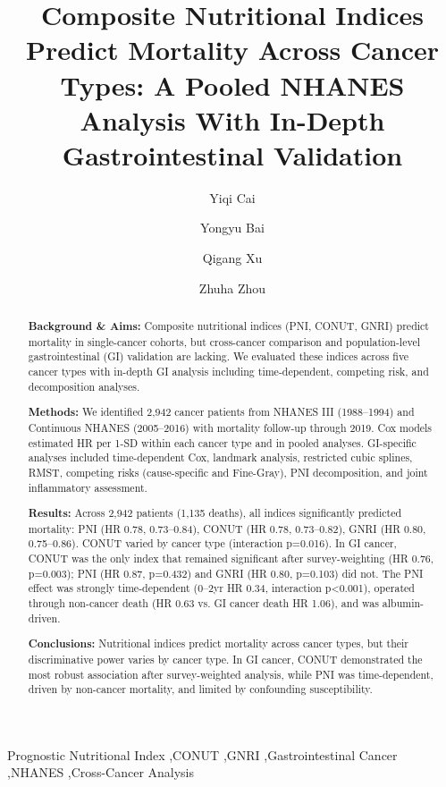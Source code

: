 \documentclass[review]{elsarticle}
\begin{document}
\begin{frontmatter}

\title{Composite Nutritional Indices Predict Mortality Across Cancer Types: A Pooled NHANES Analysis With In-Depth Gastrointestinal Validation}

\author[1]{Yiqi Cai}
\author[1]{Yongyu Bai}
\author[2]{Qigang Xu}
\author[1]{Zhuha Zhou}



\begin{abstract}
\textbf{Background \& Aims:} Composite nutritional indices (PNI, CONUT, GNRI) predict mortality in single-cancer cohorts, but cross-cancer comparison and population-level gastrointestinal (GI) validation are lacking. We evaluated these indices across five cancer types with in-depth GI analysis including time-dependent, competing risk, and decomposition analyses.

\textbf{Methods:} We identified 2,942 cancer patients from NHANES III (1988--1994) and Continuous NHANES (2005--2016) with mortality follow-up through 2019. Cox models estimated HR per 1-SD within each cancer type and in pooled analyses. GI-specific analyses included time-dependent Cox, landmark analysis, restricted cubic splines, RMST, competing risks (cause-specific and Fine-Gray), PNI decomposition, and joint inflammatory assessment.

\textbf{Results:} Across 2,942 patients (1,135 deaths), all indices significantly predicted mortality: PNI (HR 0.78, 0.73--0.84), CONUT (HR 0.78, 0.73--0.82), GNRI (HR 0.80, 0.75--0.86). CONUT varied by cancer type (interaction p=0.016). In GI cancer, CONUT was the only index that remained significant after survey-weighting (HR 0.76, p=0.003); PNI (HR 0.87, p=0.432) and GNRI (HR 0.80, p=0.103) did not. The PNI effect was strongly time-dependent (0--2yr HR 0.34, interaction p<0.001), operated through non-cancer death (HR 0.63 vs. GI cancer death HR 1.06), and was albumin-driven.

\textbf{Conclusions:} Nutritional indices predict mortality across cancer types, but their discriminative power varies by cancer type. In GI cancer, CONUT demonstrated the most robust association after survey-weighted analysis, while PNI was time-dependent, driven by non-cancer mortality, and limited by confounding susceptibility.
\end{abstract}

\begin{keyword}
Prognostic Nutritional Index \sep CONUT \sep GNRI \sep Gastrointestinal Cancer \sep NHANES \sep Cross-Cancer Analysis
\end{keyword}

\end{frontmatter}
\end{document}
